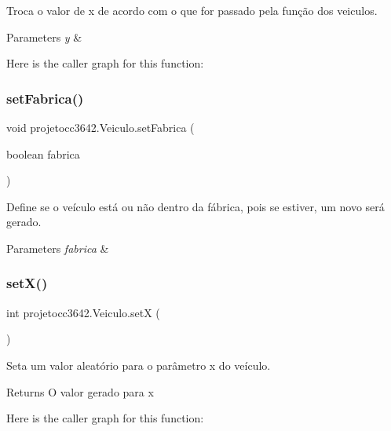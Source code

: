 Troca o valor de x de acordo com o que for passado pela função dos veiculos. 


\begin{DoxyParams}{Parameters}
{\em y} & \\
\hline
\end{DoxyParams}
Here is the caller graph for this function\+:
\mbox{\label{classprojetocc3642_1_1_veiculo_a969c7819625ad691c345b5e4da429d9b}} 
\subsubsection{set\+Fabrica()}
{\footnotesize\ttfamily void projetocc3642.\+Veiculo.\+set\+Fabrica (\begin{DoxyParamCaption}\item[{boolean}]{fabrica }\end{DoxyParamCaption})}



Define se o veículo está ou não dentro da fábrica, pois se estiver, um novo será gerado. 


\begin{DoxyParams}{Parameters}
{\em fabrica} & \\
\hline
\end{DoxyParams}
\mbox{\label{classprojetocc3642_1_1_veiculo_a36c3196f53366f42a4f92baad23cd288}} 
\subsubsection{set\+X()}
{\footnotesize\ttfamily int projetocc3642.\+Veiculo.\+setX (\begin{DoxyParamCaption}{ }\end{DoxyParamCaption})}



Seta um valor aleatório para o parâmetro x do veículo. 

\begin{DoxyReturn}{Returns}
O valor gerado para x 
\end{DoxyReturn}
Here is the caller graph for this function\+:
\mbox{\label{classprojetocc3642_1_1_veiculo_a513d4f5392f1fd8a6f9ee6970f9a178c}} 
